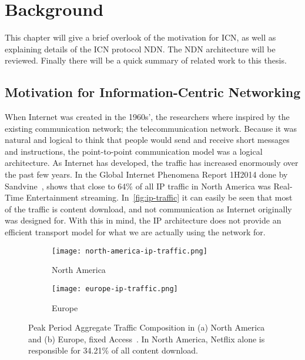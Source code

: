\chapter{Background}\label{chp:background} 

This chapter will give a brief overlook of the motivation for \gls{ICN}, as well as explaining details of the \gls{ICN} protocol \gls{NDN}.
The \gls{NDN} architecture will be reviewed.
Finally there will be a quick summary of related work to this thesis.

\section{Motivation for Information-Centric Networking}
When Internet was created in the 1960s', the researchers where inspired by the existing communication network; the telecommunication network.
Because it was natural and logical to think that people would send and receive short messages and instructions, the point-to-point communication model was a logical architecture. 
As Internet has developed, the traffic has increased enormously over the past few years. 
In the Global Internet Phenomena Report 1H2014 done by Sandvine~\cite{gipr2014}, shows that close to 64\% of all \gls{IP} traffic in North America was Real-Time Entertainment streaming.
In~\autoref{fig:ip-traffic} it can easily be seen that most of the traffic is content download, and not communication as Internet originally was designed for.
With this in mind, the \gls{IP} architecture does not provide an efficient transport model for what we are actually using the network for.

\begin{figure}[ht]
  \centering
  \begin{subfigure}{0.5\textwidth}
    \centering
    \texttt{[image: north-america-ip-traffic.png]}
    \caption{North America}
    \label{fig:north-america-ip-traffic}
  \end{subfigure}%
  \begin{subfigure}{0.5\textwidth}
    \centering
    \texttt{[image: europe-ip-traffic.png]}
    \caption{Europe}
    \label{fig:europe-ip-traffic}
  \end{subfigure}
  \caption[Peak Period Aggregate Traffic Composition]{
  Peak Period Aggregate Traffic Composition in (a) North America and (b) Europe, fixed Access~\cite{gipr2014}.
  In North America, Netflix alone is responsible for 34.21\% of all content download.
  }
  \label{fig:ip-traffic}
\end{figure}

